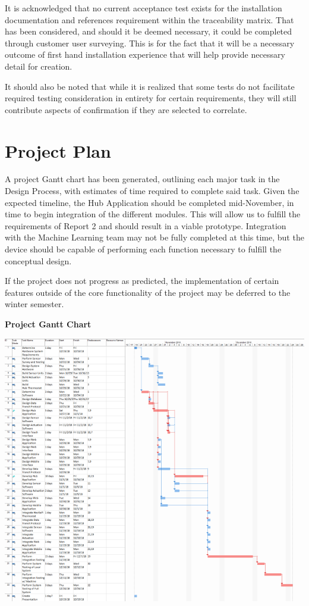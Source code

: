\documentclass{article}
\begin{document}
It is acknowledged that no current acceptance test exists for the installation documentation and references requirement within the traceability matrix. That has been considered, and should it be deemed necessary, it could be completed through customer user surveying. This is for the fact that it will be a necessary outcome of first hand installation experience that will help provide necessary detail for creation. 

It should also be noted that while it is realized that some tests do not facilitate required testing consideration in entirety for certain requirements, they will still contribute aspects of confirmation if they are selected to correlate.  

\pagebreak
\section{Project Plan}

A project Gantt chart has been generated, outlining each major task in the Design Process, with estimates of time required to complete said task. Given the expected timeline, the Hub Application should be completed mid-November, in time to begin integration of the different modules. This will allow us to fulfill the requirements of Report 2 and should result in a viable prototype. Integration with the Machine Learning team may not be fully completed at this time, but the device should be capable of performing each function necessary to fulfill the conceptual design.

If the project does not progress as predicted, the implementation of certain features outside of the core functionality of the project may be deferred to the winter semester.


\begin{flushleft}
\large
{}
\textbf{Project Gantt Chart}
\end{flushleft}

\begin{flushleft}
\includegraphics[scale = .6]{Gantt.png}
\end{flushleft}
\end{document}
